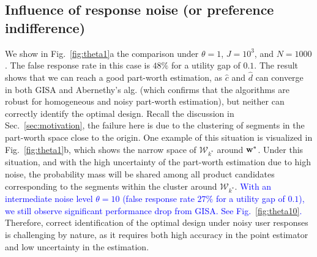 \documentclass[onecolumn,11pt]{article}
\newcommand{\highlight}[1]{{\textcolor{blue}{{#1}}}}
\newcommand{\highlight}[1]{{{#1}}}
\begin{document}
\subsection{Influence of response noise (or preference indifference)}
\label{subsec:noise}
We show in Fig.~\ref{fig:theta1}a the comparison under $\theta=1$, $J=10^3$, and $N=1000$. The false response rate in this case is $48\%$ for a utility gap of $0.1$. The result shows that we can reach a good part-worth estimation, as $\hat{c}$ and $\hat{d}$ can converge in both GISA and Abernethy's alg. (which confirms that the algorithms are robust for homogeneous and noisy part-worth estimation), but neither can correctly identify the optimal design. Recall the discussion in Sec.~\ref{sec:motivation}, the failure here is due to the clustering of segments in the part-worth space close to the origin. One example of this situation is visualized in Fig.~\ref{fig:theta1}b, which shows the narrow space of $\mathcal{W}_{k^*}$ around ${\bf w}^*$. Under this situation, and with the high uncertainty of the part-worth estimation due to high noise, the probability mass will be shared among all product candidates corresponding to the segments within the cluster around $\mathcal{W}_{k^*}$. \highlight{With an intermediate noise level $\theta=10$ (false response rate $27\%$ for a utility gap of $0.1$), we still observe significant performance drop from GISA. See Fig.~\ref{fig:theta10}.} Therefore, correct identification of the optimal design under noisy user responses is challenging by nature, as it requires both high accuracy in the point estimator and low uncertainty in the estimation. 
\end{document}
